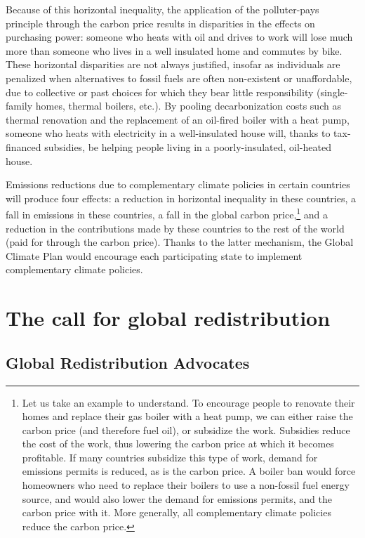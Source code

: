 \documentclass[a5paper,english,openany]{memoir}
\begin{document}
Because of this horizontal inequality, the application of the polluter-pays principle through the carbon price results in disparities in the effects on purchasing power: someone who heats with oil and drives to work will lose much more than someone who lives in a well insulated home and commutes by bike. 
These horizontal disparities are not always justified, insofar as individuals are penalized when alternatives to fossil fuels are often non-existent or unaffordable, due to collective or past choices for which they bear little responsibility (single-family homes, thermal boilers, etc.). By pooling decarbonization costs such as thermal renovation and the replacement of an oil-fired boiler with a heat pump, someone who heats with electricity in a well-insulated house will, thanks to tax-financed subsidies, be helping people living in a poorly-insulated, oil-heated house. 

Emissions reductions due to complementary climate policies in certain countries 
will produce four effects: a reduction in horizontal inequality in these countries, a fall in emissions in these countries, a fall in the global carbon price,\footnote{Let us take an example to understand. 
To encourage people to renovate their homes and replace their gas boiler with a heat pump, we can either raise the carbon price (and therefore fuel oil), or subsidize the work. 
Subsidies reduce the cost of the work, thus lowering the carbon price at which it becomes profitable. 
If many countries subsidize this type of work, demand for emissions permits is reduced, as is the carbon price. 
A boiler ban would force homeowners who need to replace their boilers to use a non-fossil fuel energy source, and would also lower the demand for emissions permits, and the carbon price with it. More generally, all complementary climate policies reduce the carbon price.} 
and a reduction in the contributions made by these countries to the rest of the world (paid for through the carbon price). Thanks to the latter mechanism, the Global Climate Plan would encourage each participating state to implement complementary climate policies. 


\chapter{The call for global redistribution\label{ch:appel}}

\section{Global Redistribution Advocates}
\end{document}
